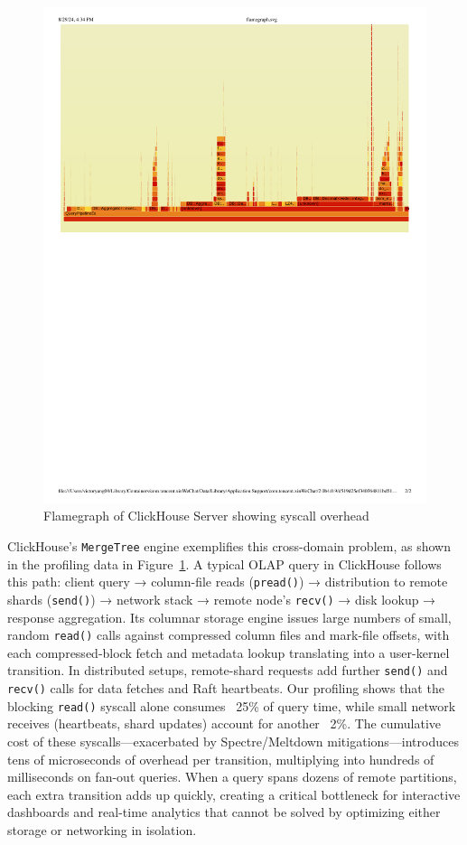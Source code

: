 \documentclass[sigconf,10pt]{acmart}
\begin{document}
\begin{figure}[h]
\centering
\includegraphics[width=\columnwidth]{img/flamegraph.pdf}
\caption{Flamegraph of ClickHouse Server showing syscall overhead}\label{fig:profiling}
\end{figure}

ClickHouse's \texttt{MergeTree} engine exemplifies this cross-domain problem, as shown in the profiling data in Figure~\ref{fig:profiling}. A typical OLAP query in ClickHouse follows this path: client query → column-file reads (\texttt{pread()}) → distribution to remote shards (\texttt{send()}) → network stack → remote node's \texttt{recv()} → disk lookup → response aggregation. Its columnar storage engine issues large numbers of small, random \texttt{read()} calls against compressed column files and mark-file offsets, with each compressed-block fetch and metadata lookup translating into a user-kernel transition. In distributed setups, remote-shard requests add further \texttt{send()} and \texttt{recv()} calls for data fetches and Raft heartbeats. Our profiling shows that the blocking \texttt{read()} syscall alone consumes ~25\% of query time, while small network receives (heartbeats, shard updates) account for another ~2\%. The cumulative cost of these syscalls—exacerbated by Spectre/Meltdown mitigations—introduces tens of microseconds of overhead per transition, multiplying into hundreds of milliseconds on fan-out queries. When a query spans dozens of remote partitions, each extra transition adds up quickly, creating a critical bottleneck for interactive dashboards and real-time analytics that cannot be solved by optimizing either storage or networking in isolation.
\end{document}

